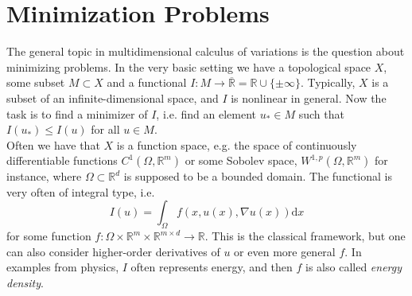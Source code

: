 \section{Minimization Problems}
The general topic in multidimensional calculus of variations is the question about minimizing problems. In the very basic setting we have a topological space $X$, some subset $M\subset X$ and a functional $I:M\longrightarrow\overline{\mathbb{R}}=\mathbb{R}\cup\{\pm\infty\}$. Typically, $X$ is a subset of an infinite-dimensional space, and $I$ is nonlinear in general. Now the task is to find a minimizer of $I$, i.e. find an element $u_*\in M$ such that $I(u_*)\leq I(u)$ for all $u\in M$.\\

Often we have that $X$ is a function space, e.g. the space of continuously differentiable functions $C^1(\Omega,\mathbb{R}^m)$ or some Sobolev space, $W^{1,p}(\Omega,\mathbb{R}^m)$ for instance, where $\Omega\subset\mathbb{R}^d$ is supposed to be a bounded domain. The functional is very often of integral type, i.e.
\[
    I(u)=\int_\Omega{f(x,u(x),\nabla u(x))\mathrm{d}x}
\]
for some function $f:\Omega\times\mathbb{R}^m\times\mathbb{R}^{m\times d}\longrightarrow\mathbb{R}$. This is the classical framework, but one can also consider higher-order derivatives of $u$ or even more general $f$. In examples from physics, $I$ often represents energy, and then $f$ is also called \textit{energy density}.